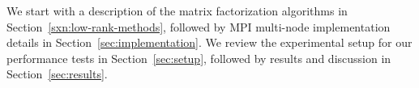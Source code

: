 We start with a description of the matrix factorization algorithms in
Section~\ref{sxn:low-rank-methods}, followed by MPI multi-node
implementation details in Section~\ref{sec:implementation}. We review the
experimental setup for our performance tests in Section~\ref{sec:setup},
followed by results and discussion in Section~\ref{sec:results}.

